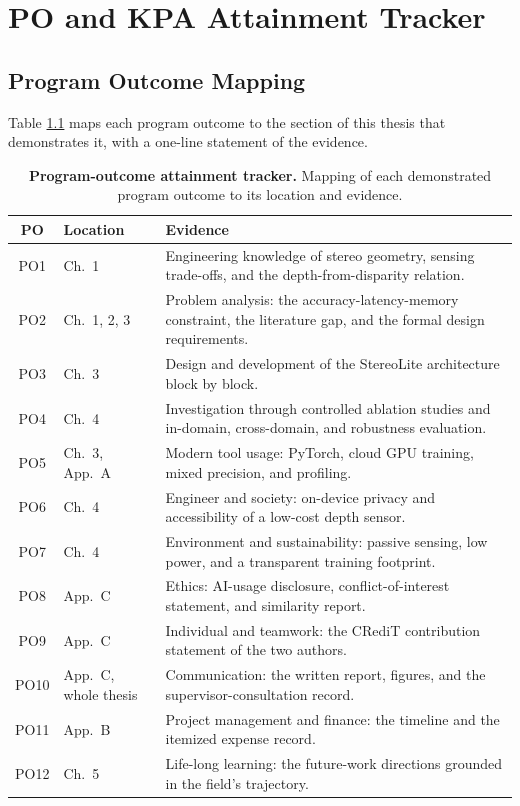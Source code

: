 \chapter{PO and KPA Attainment Tracker}

\section{Program Outcome Mapping}
Table \ref{tab:po_tracker} maps each program outcome to the section of this
thesis that demonstrates it, with a one-line statement of the evidence.

\begin{table}[!htbp]
\centering
\caption{\textbf{Program-outcome attainment tracker.} Mapping of each demonstrated program outcome to its location and evidence.}
\label{tab:po_tracker}
\small
\begin{tabular}{clp{7.6cm}}
\toprule
PO & Location & Evidence\\
\midrule
PO1 & Ch.~1 & Engineering knowledge of stereo geometry, sensing trade-offs, and the depth-from-disparity relation.\\
PO2 & Ch.~1, 2, 3 & Problem analysis: the accuracy-latency-memory constraint, the literature gap, and the formal design requirements.\\
PO3 & Ch.~3 & Design and development of the StereoLite architecture block by block.\\
PO4 & Ch.~4 & Investigation through controlled ablation studies and in-domain, cross-domain, and robustness evaluation.\\
PO5 & Ch.~3, App.~A & Modern tool usage: PyTorch, cloud GPU training, mixed precision, and profiling.\\
PO6 & Ch.~4 & Engineer and society: on-device privacy and accessibility of a low-cost depth sensor.\\
PO7 & Ch.~4 & Environment and sustainability: passive sensing, low power, and a transparent training footprint.\\
PO8 & App.~C & Ethics: AI-usage disclosure, conflict-of-interest statement, and similarity report.\\
PO9 & App.~C & Individual and teamwork: the CRediT contribution statement of the two authors.\\
PO10 & App.~C, whole thesis & Communication: the written report, figures, and the supervisor-consultation record.\\
PO11 & App.~B & Project management and finance: the timeline and the itemized expense record.\\
PO12 & Ch.~5 & Life-long learning: the future-work directions grounded in the field's trajectory.\\
\bottomrule
\end{tabular}
\end{table}

